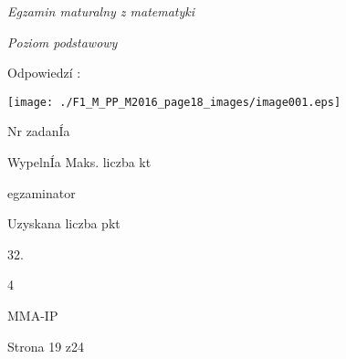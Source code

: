 \documentclass[a4paper,12pt]{article}
\begin{document}
{\it Egzamin maturalny z matematyki}

{\it Poziom podstawowy}

Odpowiedzí :
\begin{center}
\texttt{[image: ./F1\_M\_PP\_M2016\_page18\_images/image001.eps]}
\end{center}
Nr zadanÍa

WypelnÍa Maks. liczba kt

egzaminator

Uzyskana liczba pkt

32.

4

MMA-IP

Strona 19 z24
\end{document}
